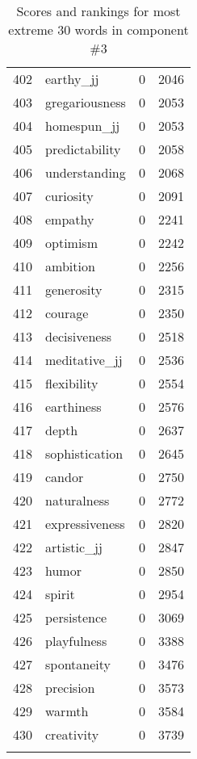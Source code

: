 \begin{longtable}[!htbp]{| rlr@{.}l |}
    402 & earthy\_jj & 0 & 2046 \\
    403 & gregariousness & 0 & 2053 \\
    404 & homespun\_jj & 0 & 2053 \\
    405 & predictability & 0 & 2058 \\
    406 & understanding & 0 & 2068 \\
    407 & curiosity & 0 & 2091 \\
    408 & empathy & 0 & 2241 \\
    409 & optimism & 0 & 2242 \\
    410 & ambition & 0 & 2256 \\
    411 & generosity & 0 & 2315 \\
    412 & courage & 0 & 2350 \\
    413 & decisiveness & 0 & 2518 \\
    414 & meditative\_jj & 0 & 2536 \\
    415 & flexibility & 0 & 2554 \\
    416 & earthiness & 0 & 2576 \\
    417 & depth & 0 & 2637 \\
    418 & sophistication & 0 & 2645 \\
    419 & candor & 0 & 2750 \\
    420 & naturalness & 0 & 2772 \\
    421 & expressiveness & 0 & 2820 \\
    422 & artistic\_jj & 0 & 2847 \\
    423 & humor & 0 & 2850 \\
    424 & spirit & 0 & 2954 \\
    425 & persistence & 0 & 3069 \\
    426 & playfulness & 0 & 3388 \\
    427 & spontaneity & 0 & 3476 \\
    428 & precision & 0 & 3573 \\
    429 & warmth & 0 & 3584 \\
    430 & creativity & 0 & 3739 \\
    \hline
    \caption{Scores and rankings for most extreme 30 words in component \#3} \\
\end{longtable}
